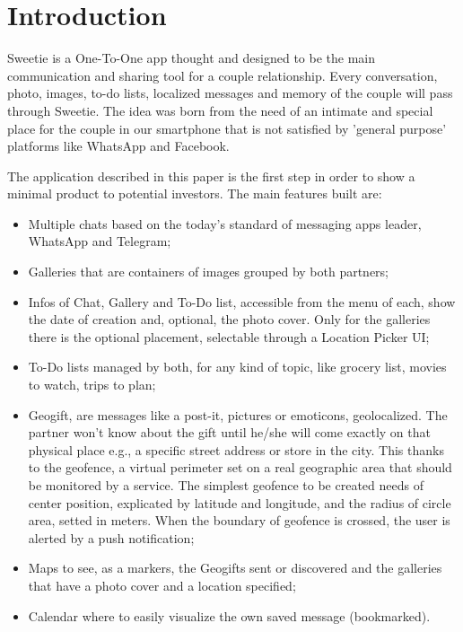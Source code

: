 
\section{Introduction}
\label{sec:introduction}

Sweetie is a One-To-One app thought and designed to be the main communication and sharing
tool for a couple relationship. Every conversation, photo, images, to-do lists, localized messages and memory of the couple will pass through Sweetie. The idea was born from the need of an intimate and special place for the couple in our smartphone that is not satisfied by 'general purpose' platforms like WhatsApp and Facebook.

The application described in this paper is the first step in order to show a minimal product to potential investors. The main features built are:

\begin{itemize}
	\item Multiple chats based on the today's standard of messaging apps leader, WhatsApp and Telegram;
	\item Galleries that are containers of images grouped by both partners;
	\item Infos of Chat, Gallery and To-Do list, accessible from the menu of each, show the date of creation and, optional, the photo cover. Only for the galleries there is the optional placement, selectable through a Location Picker UI;
	\item To-Do lists managed by both, for any kind of topic, like grocery list, movies to watch, trips to plan;
	\item Geogift, are messages like a post-it, pictures or emoticons, geolocalized. The partner won't know about the gift until he/she will come exactly on that physical place e.g., a specific street address or store in the city. This thanks to the geofence, a virtual perimeter set on a real geographic area that should be monitored by a service. The simplest geofence to be created needs of center position, explicated by latitude and longitude, and the radius of circle area, setted in meters. When the boundary of geofence is crossed, the user is alerted by a push notification;
	\item Maps to see, as a markers, the Geogifts sent or discovered and the galleries that have a photo cover and a location specified;
	\item Calendar where to easily visualize the own saved message (bookmarked).
\end{itemize}

